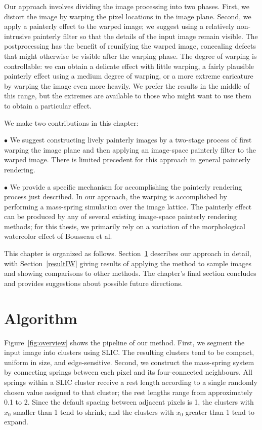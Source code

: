 Our approach involves dividing the image processing into two phases. First, we
distort the image by warping the pixel locations in the image plane. Second, we
apply a painterly effect to the warped image; we suggest using a relatively
non-intrusive painterly filter so that the details of the input image remain
visible. The postprocessing has the benefit of reunifying the warped image,
concealing defects that might otherwise be visible after the warping phase. 
The degree of
warping is controllable: we can obtain a delicate effect with little warping, a
fairly plausible painterly effect using a medium degree of warping, or a more
extreme caricature by warping the image even more heavily. We prefer the results
in the middle of this range, but the extremes are available to those who might
want to use them to obtain a particular effect.

We make two contributions in this chapter:

$\bullet$ We suggest constructing lively painterly images by a two-stage process
of first warping the image plane and then applying an image-space painterly
filter to the warped image. There is limited precedent for this approach in
general painterly rendering.

$\bullet$ We provide a specific mechanism for accomplishing the painterly
rendering process just described. In our approach, the warping is accomplished
by performing a mass-spring simulation over the image lattice. The painterly
effect can be produced by any of several existing image-space painterly
rendering methods; for this thesis, we primarily rely on a variation of the
morphological watercolor effect of Bousseau et al.

This chapter is organized as follows. Section~\ref{algorithmIW} describes our approach in detail, with Section~\ref{resultIW}
giving results of applying the method to sample images and showing comparisons
to other methods. The chapter's final section concludes and provides suggestions
about possible future directions.

\section{Algorithm} \label{algorithmIW}



Figure~\ref{fig:overview} shows the pipeline of our method. First, we segment the input image into clusters using SLIC. The resulting clusters tend to be compact, uniform in size, and edge-sensitive.  Second, we construct the mass-spring system by connecting springs between each pixel and its four-connected neighbours. All springs within a SLIC cluster receive a rest length
according to a single randomly chosen value assigned to that
cluster; the rest lengths range from approximately 0.1 to 2. Since the default spacing between adjacent pixels is 1, the clusters with $x_0$ smaller than 1 tend to shrink; and the clusters with $x_0$ greater than 1 tend to expand.


